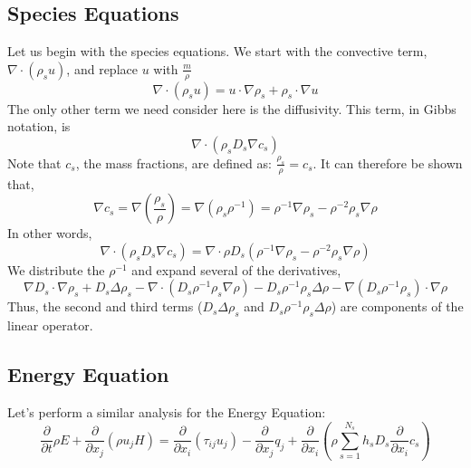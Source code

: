 \documentclass[10pt]{article}
\newcommand{\myred}[1]{{\color{red} #1}}
\begin{document}


%
%
%
\subsection{Species Equations}
Let us begin with the species equations. We start with the convective
term, $\nabla \cdot (\rho_s u)$, and replace $u$ with $\frac{m}{\rho}$
\begin{equation}
  \nabla \cdot (\rho_s u) = u \cdot \nabla \rho_s + \rho_s \cdot \nabla
   u 
\end{equation}
\newline
\newline
The only other term we need consider here is 
the diffusivity. This term, in Gibbs notation, is
\begin{equation}
  \nabla \cdot (\rho_s D_s \nabla c_s)
\end{equation}
Note that $c_s$, the mass fractions, are defined as:
$\frac{\rho_s}{\rho} = 
c_s$.  It can therefore be shown that,
\begin{equation}
  \nabla c_s = \nabla (\frac{\rho_s}{\rho}) = \nabla (\rho_s \rho^{-1})
             = \rho^{-1} \nabla \rho_s - \rho^{-2} \rho_s \nabla \rho
\end{equation}
In other words,
\begin{equation}
  \label{eq:speciesdiffexpansion}
  \nabla \cdot (\rho_s D_s \nabla c_s) = \nabla \cdot \rho D_s (\rho^{-1} \nabla \rho_s - \rho^{-2} \rho_s \nabla \rho)
\end{equation}
We distribute the $\rho^{-1}$ and expand several of the derivatives,
\begin{equation}
  \nabla D_s \cdot \nabla \rho_s + D_s \Delta \rho_s - \nabla \cdot (D_s \rho^{-1} \rho_s \nabla \rho) - D_s \rho^{-1} \rho_s \Delta \rho - \nabla(D_s \rho^{-1} \rho_s) \cdot \nabla \rho
\end{equation}
Thus, the second and third terms ($D_s \Delta \rho_s$ and $D_s \rho^{-1}
\rho_s \Delta \rho$) are components of the linear operator. 

\subsection{Energy Equation}

Let's perform a similar analysis for the Energy Equation:
\begin{equation}
\frac{\partial}{\partial t} \rho E + \frac{\partial }{\partial x_j}\left(\rho
u_j H\right) = \frac{\partial }{\partial x_i}\left(\tau_{ij}u_j\right) -
\frac{\partial }{\partial x_j}q_j + \frac{\partial }{\partial x_i}\left(\rho
\sum^{N_s}_{s=1} h_s D_s \frac{\partial}{\partial x_i} c_s\right)
\end{equation}
\end{document}
